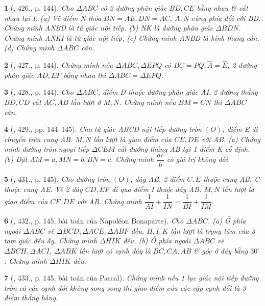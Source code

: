 \documentclass{article}
\newtheorem{baitoan}{}
\begin{document}
\begin{baitoan}[\cite{Binh_Toan_9_tap_2}, 426., p. 144]
	Cho $\Delta ABC$ có 2 đường phân giác $BD,CE$ bằng nhau \& cắt nhau tại I. (a) Vẽ điểm N thỏa $BN = AE,DN = AC$, $A,N$ cùng phía đối với BD. Chứng minh ANBD là tứ giác nội tiếp. (b) NK là đường phân giác $\Delta BDN$. Chứng minh ANKI là tứ giác nội tiếp. (c) Chứng minh ANBD là hình thang cân. (d) Chứng minh $\Delta ABC$ cân.
\end{baitoan}

\begin{baitoan}[\cite{Binh_Toan_9_tap_2}, 427., p. 144]
	Chứng minh nếu $\Delta ABC,\Delta EPQ$ có $BC = PQ,\widehat{A} = \widehat{E}$, 2 đường phân giác $AD,EF$ bằng nhau thì $\Delta ABC = \Delta EPQ$.
\end{baitoan}

\begin{baitoan}[\cite{Binh_Toan_9_tap_2}, 428., p. 144]
	Cho $\Delta ABC$, điểm D thuộc đường phân giác AI. 2 đường thẳng $BD,CD$ cắt $AC,AB$ lần lượt ở $M,N$. Chứng minh nếu $BM = CN$ thì $\Delta ABC$ cân.
\end{baitoan}

\begin{baitoan}[\cite{Binh_Toan_9_tap_2}, 429., pp. 144--145]
	Cho tứ giác ABCD nội tiếp đường tròn $(O)$, điểm E di chuyển trên cung AB. $M,N$ lần lượt là giao điểm của $CE,DE$ với AB. (a) Chứng minh đường tròn ngoại tiếp $\Delta CEM$ cắt đường thẳng AB tại 1 điểm K cố định. (b) Đặt $AM = a,MN = b,BN = c$. Chứng minh $\dfrac{ac}{b}$ có giá trị không đổi.
\end{baitoan}

\begin{baitoan}[\cite{Binh_Toan_9_tap_2}, 431., p. 145]
	Cho đường tròn $(O)$, dây AB, 2 điểm $C,E$ thuộc cung AB, C thuộc cung AE. Vẽ 2 dây $CD,EF$ đi qua điểm I thuộc dây AB. $M,N$ lần lượt là giao điểm của $CF,DE$ với AB. Chứng minh $\dfrac{1}{AI} + \dfrac{1}{IN} = \dfrac{1}{BI} + \dfrac{1}{IM}$.
\end{baitoan}

\begin{baitoan}[\cite{Binh_Toan_9_tap_2}, 432., p. 145, bài toán của Napol\'eon Bonaparte]
	Cho $\Delta ABC$. (a) Ở phía ngoài $\Delta ABC$ vẽ $\Delta BCD,\Delta ACE,\Delta ABF$ đều. $H,I,K$ lần lượt là trọng tâm của 3 tam giác đều ấy. Chứng minh $\Delta HIK$ đều. (b) Ở phía ngoài $\Delta ABC$ vẽ $\Delta BCH,\Delta ACI$, $\Delta ABK$ lần lượt có cạnh đáy là $BC,CA,AB$ \& góc ở đáy bằng $30^\circ$. Chứng minh $\Delta HIK$ đều.
\end{baitoan}

\begin{baitoan}[\cite{Binh_Toan_9_tap_2}, 433., p. 145, bài toán của Pascal]
	Chứng minh nếu 1 lục giác nội tiếp đường tròn có các cạnh đối không song song thì giao điểm của các cặp cạnh đối là 3 điểm thẳng hàng.
\end{baitoan}


\printbibliography[heading=bibintoc]
\end{document}
